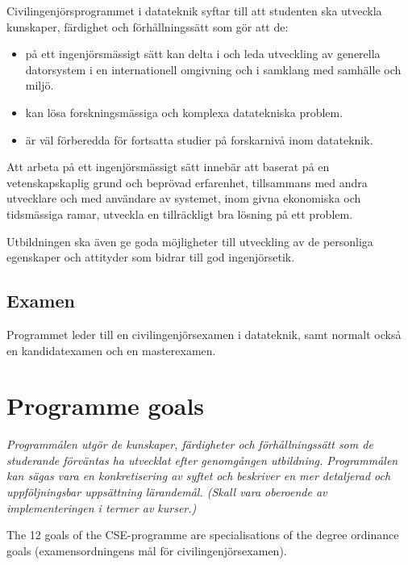 \documentclass[twocolumn]{article}
\newcommand{\meta}[1]{{\small \emph{#1}}}
\begin{document}
Civilingenjörsprogrammet i datateknik syftar till att studenten ska
utveckla kunskaper, färdighet och förhållningssätt som gör att de:
\begin{itemize}
\item på ett ingenjörsmässigt sätt kan delta i och leda utveckling av
  generella datorsystem i en internationell omgivning och i samklang
  med samhälle och miljö.
\item kan lösa forskningsmässiga och komplexa datatekniska problem.
\item är väl förberedda för fortsatta studier på forskarnivå inom
  datateknik.
\end{itemize}
Att arbeta på ett ingenjörsmässigt sätt innebär att
baserat på en vetenskapskaplig grund och beprövad erfarenhet,
tillsammans med andra utvecklare och med användare av systemet,
inom givna ekonomiska och tidsmässiga ramar,
utveckla en tillräckligt bra lösning på ett problem.

Utbildningen ska även ge goda möjligheter till utveckling av de
personliga egenskaper och attityder som bidrar till god ingenjörsetik.

\subsection{Examen}

Programmet leder till en civilingenjörsexamen i datateknik, samt
normalt också en kandidat\-examen och en masterexamen.

\section{Programme goals}
\meta{Programmålen utgör de kunskaper, färdigheter och
  förhållningssätt som de studerande förväntas ha utvecklat efter
  genomgången utbildning. Programmålen kan sägas vara en
  konkretisering av syftet och beskriver en mer detaljerad och
  uppföljningsbar uppsättning lärandemål. (Skall vara oberoende av
  implementeringen i termer av kurser.)}

The 12 goals of the CSE-programme are specialisations of the degree
ordinance goals (examensordningens mål för civilingenjörsexamen).
\end{document}

